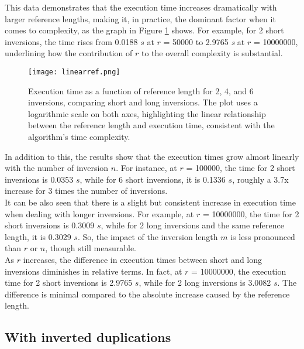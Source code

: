 This data demonstrates that the execution time increases dramatically with larger reference lengths, making it, in practice, the dominant factor when it comes to complexity, as the graph in Figure \ref{fig:refgraph} shows. For example, for 2 short inversions, the time rises from 0.0188 \( s \) at \( r \) = 50000 to 2.9765 \textit{s} at \( r \) = 10000000, underlining how the contribution of \( r \) to the overall complexity is substantial. \\

\begin{figure}[h]

  \centering
    \texttt{[image: linearref.png]}

  \caption{Execution time as a function of reference length for 2, 4, and 6 inversions, comparing short and long inversions. The plot uses a logarithmic scale on both axes, highlighting the linear relationship between the reference length and execution time, consistent with the algorithm's time complexity.}
  \label{fig:refgraph}
\end{figure}

In addition to this, the results show that the execution times grow almost linearly with the number of inversion \( n \). For instance, at \( r \) = 100000, the time for 2 short inversions is 0.0353 \( s \), while for 6 short inversions, it is 0.1336 \( s \), roughly a 3.7x increase for 3 times the number of inversions.\\
It can be also seen that there is a slight but consistent increase in execution time when dealing with longer inversions. For example, at \( r \) = 10000000, the time for 2 short inversions is 0.3009 \( s \), while for 2 long inversions and the same reference length, it is 0.3029 \( s \). So, the impact of the inversion length \( m \) is less pronounced than \( r \) or \( n \), though still measurable. \\
As \( r \) increases, the difference in execution times between short and long inversions diminishes in relative terms. In fact, at \( r \) = 10000000, the execution time for 2 short inversions is 2.9765 \( s \), while for 2 long inversions is 3.0082 \( s \). The difference is minimal compared to the absolute increase caused by the reference length.

\subsection{With inverted duplications}

